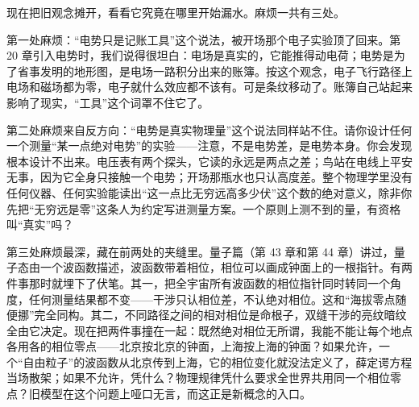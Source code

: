 
\begin{mainline}
现在把旧观念摊开，看看它究竟在哪里开始漏水。麻烦一共有三处。

第一处麻烦：“电势只是记账工具”这个说法，被开场那个电子实验顶了回来。第 20 章引入电势时，我们说得很坦白：电场是真实的，它能推得动电荷；电势是为了省事发明的地形图，是电场一路积分出来的账簿。按这个观念，电子飞行路径上电场和磁场都为零，电子就什么效应都不该有。可是条纹移动了。账簿自己站起来影响了现实，“工具”这个词罩不住它了。

第二处麻烦来自反方向：“电势是真实物理量”这个说法同样站不住。请你设计任何一个测量“某一点绝对电势”的实验——注意，不是电势差，是电势本身。你会发现根本设计不出来。电压表有两个探头，它读的永远是两点之差；鸟站在电线上平安无事，因为它全身只接触一个电势；开场那瓶水也只认高度差。整个物理学里没有任何仪器、任何实验能读出“这一点比无穷远高多少伏”这个数的绝对意义，除非你先把“无穷远是零”这条人为约定写进测量方案。一个原则上测不到的量，有资格叫“真实”吗？

第三处麻烦最深，藏在前两处的夹缝里。量子篇（第 43 章和第 44 章）讲过，量子态由一个波函数描述，波函数带着相位，相位可以画成钟面上的一根指针。有两件事那时就埋下了伏笔。其一，把全宇宙所有波函数的相位指针同时转同一个角度，任何测量结果都不变——干涉只认相位差，不认绝对相位。这和“海拔零点随便挪”完全同构。其二，不同路径之间的相对相位是命根子，双缝干涉的亮纹暗纹全由它决定。现在把两件事撞在一起：既然绝对相位无所谓，我能不能让每个地点各用各的相位零点——北京按北京的钟面，上海按上海的钟面？如果允许，一个“自由粒子”的波函数从北京传到上海，它的相位变化就没法定义了，薛定谔方程当场散架；如果不允许，凭什么？物理规律凭什么要求全世界共用同一个相位零点？旧模型在这个问题上哑口无言，而这正是新概念的入口。
\end{mainline}


